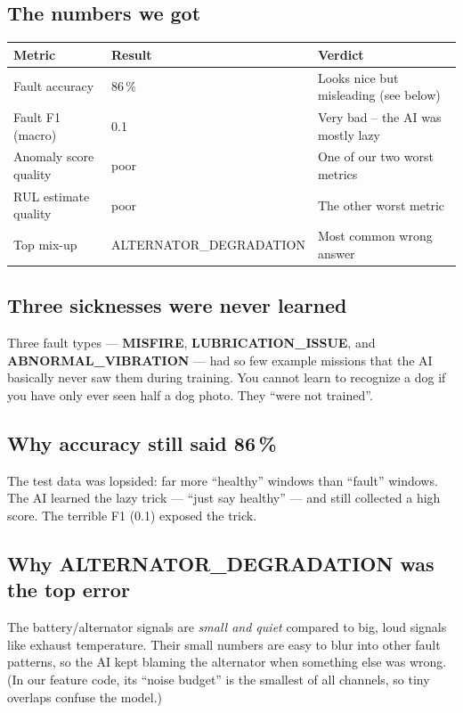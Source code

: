 \documentclass[11pt]{article}
\begin{document}
\subsection{The numbers we got}

\begin{center}
\begin{tabular}{lll}
\toprule
\textbf{Metric} & \textbf{Result} & \textbf{Verdict} \\
\midrule
Fault accuracy           & 86\,\%    & Looks nice but misleading (see below) \\
Fault F1 (macro)         & 0.1       & Very bad -- the AI was mostly lazy \\
Anomaly score quality    & poor      & One of our two worst metrics \\
RUL estimate quality     & poor      & The other worst metric \\
Top mix-up               & ALTERNATOR\_DEGRADATION & Most common wrong answer \\
\bottomrule
\end{tabular}
\end{center}

\subsection{Three sicknesses were never learned}
Three fault types --- \textbf{MISFIRE}, \textbf{LUBRICATION\_ISSUE}, and
\textbf{ABNORMAL\_VIBRATION} --- had so few example missions that the AI
basically never saw them during training. You cannot learn to recognize a
dog if you have only ever seen half a dog photo. They ``were not trained''.

\subsection{Why accuracy still said 86\,\%}
The test data was lopsided: far more ``healthy'' windows than ``fault''
windows. The AI learned the lazy trick --- ``just say healthy'' --- and
still collected a high score. The terrible F1 (0.1) exposed the trick.

\subsection{Why ALTERNATOR\_DEGRADATION was the top error}
The battery/alternator signals are \emph{small and quiet} compared to big,
loud signals like exhaust temperature. Their small numbers are easy to
blur into other fault patterns, so the AI kept blaming the alternator when
something else was wrong. (In our feature code, its ``noise budget'' is the
smallest of all channels, so tiny overlaps confuse the model.)
\end{document}
